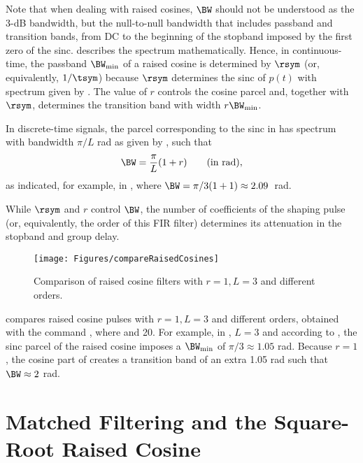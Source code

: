 Note that when dealing with raised cosines, $\BW$ should not be understood as the 3-dB bandwidth, but the null-to-null bandwidth that includes passband and transition bands, from DC to the beginning of the stopband imposed by the first zero of the sinc.  describes the spectrum mathematically.
Hence, in continuous-time, the passband $\BW_{\textrm{min}}$ of a raised cosine is determined by $\rsym$ (or, equivalently, $1/\tsym$) because $\rsym$ determines the sinc of $p(t)$ with spectrum given by . 
The value of $r$ controls the cosine parcel and, together with $\rsym$, determines the transition band with width $r \BW_{\textrm{min}}$.

In discrete-time signals, the parcel corresponding to the sinc in  has spectrum with bandwidth $\pi / L$ rad as given by , such that
\[
\BW= \frac{\pi}{L} (1+r) ~~~~~~\textrm{(in rad)},
\]
as indicated, for example, in , where $\BW = \pi/3 (1+1) \approx 2.09$~rad.

While $\rsym$ and $r$ control $\BW$, the number of coefficients of the shaping pulse (or, equivalently, the order of this FIR filter) determines its attenuation in the stopband and group delay. 

\begin{figure}[htbp]
\centering
\texttt{[image: Figures/compareRaisedCosines]}
\caption{Comparison of raised cosine filters with $r=1, L=3$ and different orders.\label{fig:compareRaisedCosines}}
\end{figure}

 compares raised cosine pulses with $r=1, L=3$ and different orders, obtained with the command , where  and 20.  For example, in , $L=3$ and according to , the sinc parcel of the raised cosine imposes a $\BW_{\textrm{min}}$ of $\pi/3 \approx 1.05$ rad. Because $r=1$, the cosine part of  creates a transition band of an extra 1.05 rad such that $\BW \approx 2$ rad.

\section{Matched Filtering and the Square-Root Raised Cosine}
\label{sec:matchedFilterAndSquareRootCosine}

